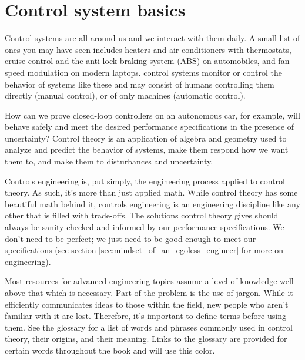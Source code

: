 
\chapter{Control system basics}

Control systems are all around us and we interact with them daily. A small list
of ones you may have seen includes heaters and air conditioners with
thermostats, cruise control and the anti-lock braking system (ABS) on
automobiles, and fan speed modulation on modern laptops. \Glspl{control system}
monitor or control the behavior of \glspl{system} like these and may consist of
humans controlling them directly (manual control), or of only machines
(automatic control).

How can we prove closed-loop \glspl{controller} on an autonomous car, for
example, will behave safely and meet the desired performance specifications in
the presence of uncertainty? Control theory is an application of algebra and
geometry used to analyze and predict the behavior of \glspl{system}, make them
respond how we want them to, and make them  to
\glspl{disturbance} and uncertainty.

Controls engineering is, put simply, the engineering process applied to control
theory. As such, it's more than just applied math. While control theory has some
beautiful math behind it, controls engineering is an engineering discipline like
any other that is filled with trade-offs. The solutions control theory gives
should always be sanity checked and informed by our performance specifications.
We don't need to be perfect; we just need to be good enough to meet our
specifications (see section \ref{sec:mindset_of_an_egoless_engineer} for more on
engineering).
\begin{remark}
  Most resources for advanced engineering topics assume a level of knowledge
  well above that which is necessary. Part of the problem is the use of jargon.
  While it efficiently communicates ideas to those within the field, new people
  who aren't familiar with it are lost. Therefore, it's important to define
  terms before using them. See the glossary for a list of words and phrases
  commonly used in control theory, their origins, and their meaning. Links to
  the glossary are provided for certain words throughout the book and will use
  \textcolor{glscolor}{this color}.
\end{remark}

\renewcommand*{\chapterpath}{\partpath/control-system-basics}




